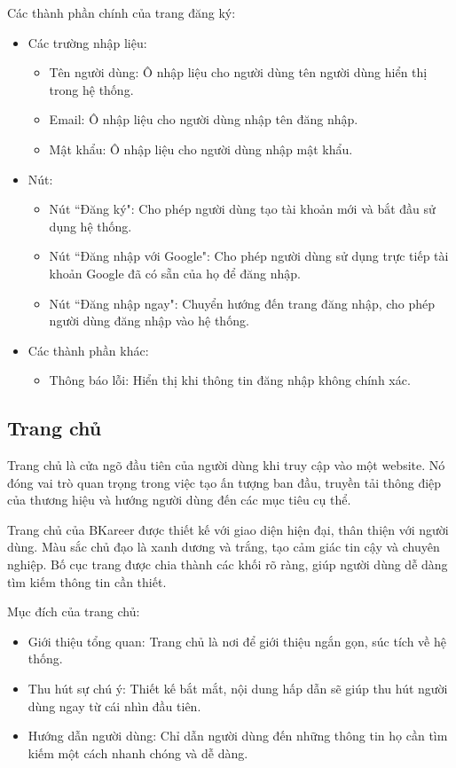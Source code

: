 Các thành phần chính của trang đăng ký:
\begin{itemize}
    \item Các trường nhập liệu:
        \begin{itemize}
            \item Tên người dùng: Ô nhập liệu cho người dùng tên người dùng hiển thị trong hệ thống.
            \item Email: Ô nhập liệu cho người dùng nhập tên đăng nhập.
            \item Mật khẩu: Ô nhập liệu cho người dùng nhập mật khẩu.
        \end{itemize}
    \item Nút:
        \begin{itemize}
            \item Nút ``Đăng ký": Cho phép người dùng tạo tài khoản mới và bắt đầu sử dụng hệ thống.
            \item Nút ``Đăng nhập với Google": Cho phép người dùng sử dụng trực tiếp tài khoản Google đã có sẵn của họ để đăng nhập.
            \item Nút ``Đăng nhập ngay": Chuyển hướng đến trang đăng nhập, cho phép người dùng đăng nhập vào hệ thống.
        \end{itemize}
    \item Các thành phần khác:
        \begin{itemize}
            \item Thông báo lỗi: Hiển thị khi thông tin đăng nhập không chính xác.
        \end{itemize}
\end{itemize}


\subsection{Trang chủ}
Trang chủ là cửa ngõ đầu tiên của người dùng khi truy cập vào một website. Nó đóng vai trò quan trọng trong việc tạo ấn tượng ban đầu, truyền tải thông điệp của thương hiệu và hướng người dùng đến các mục tiêu cụ thể.

Trang chủ của BKareer được thiết kế với giao diện hiện đại, thân thiện với người dùng. Màu sắc chủ đạo là xanh dương và trắng, tạo cảm giác tin cậy và chuyên nghiệp. Bố cục trang được chia thành các khối rõ ràng, giúp người dùng dễ dàng tìm kiếm thông tin cần thiết.

Mục đích của trang chủ:
\begin{itemize}
    \item Giới thiệu tổng quan: Trang chủ là nơi để giới thiệu ngắn gọn, súc tích về hệ thống.
    \item Thu hút sự chú ý: Thiết kế bắt mắt, nội dung hấp dẫn sẽ giúp thu hút người dùng ngay từ cái nhìn đầu tiên.
    \item Hướng dẫn người dùng: Chỉ dẫn người dùng đến những thông tin họ cần tìm kiếm một cách nhanh chóng và dễ dàng.
\end{itemize}


